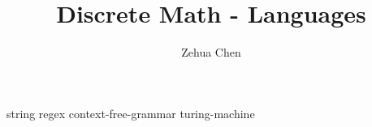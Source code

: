 \documentclass[letterpaper, 12pt]{report}
\title{Discrete Math - Languages}
\author{Zehua Chen}
\begin{document}
  \maketitle
  \tableofcontents

  \setmainstyles

  {string}
  {regex}
  {context-free-grammar}
  {turing-machine}
\end{document}
